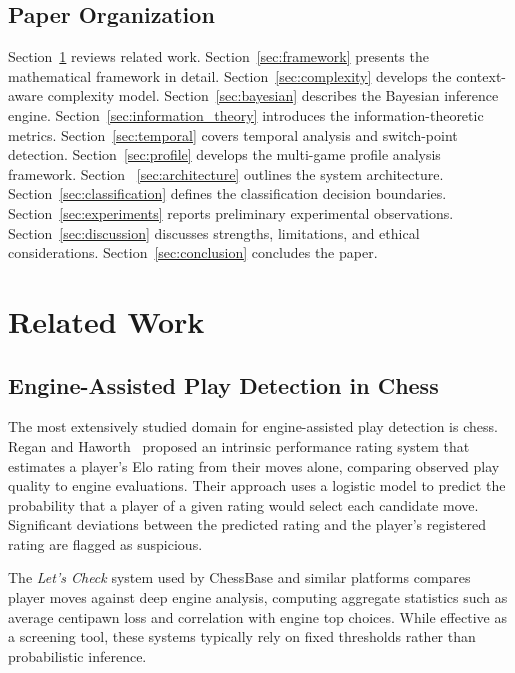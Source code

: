 \documentclass[11pt,a4paper]{article}
\begin{document}
\subsection{Paper Organization}

Section~\ref{sec:related_work} reviews related work. Section~\ref{sec:framework}
presents the mathematical framework in detail. Section~\ref{sec:complexity}
develops the context-aware complexity model. Section~\ref{sec:bayesian}
describes the Bayesian inference engine. Section~\ref{sec:information_theory}
introduces the information-theoretic metrics. Section~\ref{sec:temporal}
covers temporal analysis and switch-point detection. Section~\ref{sec:profile}
develops the multi-game profile analysis framework. Section~%
\ref{sec:architecture} outlines the system architecture.
Section~\ref{sec:classification} defines the classification decision
boundaries. Section~\ref{sec:experiments} reports preliminary experimental
observations. Section~\ref{sec:discussion} discusses strengths, limitations,
and ethical considerations. Section~\ref{sec:conclusion} concludes the paper.


\section{Related Work}
\label{sec:related_work}

\subsection{Engine-Assisted Play Detection in Chess}

The most extensively studied domain for engine-assisted play detection is chess.
Regan and Haworth~\citep{regan2011intrinsic} proposed an intrinsic performance
rating system that estimates a player's Elo rating from their moves alone,
comparing observed play quality to engine evaluations. Their approach uses a
logistic model to predict the probability that a player of a given rating would
select each candidate move. Significant deviations between the predicted rating
and the player's registered rating are flagged as suspicious.

The \emph{Let's Check} system used by ChessBase and similar platforms
\citep{guid2006computer} compares player moves against deep engine analysis,
computing aggregate statistics such as average centipawn loss and correlation
with engine top choices. While effective as a screening tool, these systems
typically rely on fixed thresholds rather than probabilistic inference.
\end{document}
